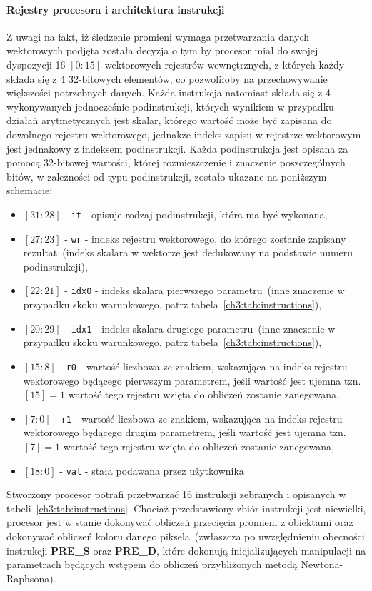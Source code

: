 \paragraph{Rejestry procesora i architektura instrukcji}
Z uwagi na fakt, iż śledzenie promieni wymaga przetwarzania danych wektorowych podjęta została decyzja o tym by procesor miał do swojej dyspozycji 16 $[0:15]$ wektorowych rejestrów wewnętrznych, z których każdy składa się z 4 32-bitowych elementów, co pozwoliłoby na przechowywanie większości potrzebnych danych. Każda instrukcja natomiast składa się z 4 wykonywanych jednocześnie podinstrukcji, których wynikiem w przypadku działań arytmetycznych jest skalar, którego wartość może być zapisana  do dowolnego rejestru wektorowego, jednakże indeks zapisu w rejestrze wektorowym jest jednakowy z indeksem podinstrukcji. Każda podinstrukcja jest opisana za pomocą 32-bitowej wartości, której rozmieszczenie i znaczenie poszczególnych bitów, w zależności od typu podinstrukcji, zostało ukazane na poniższym schemacie:
\begin{itemize}
\item[] $[31:28]$ - \texttt{it} - opisuje rodzaj podinstrukcji, która ma być wykonana,
\item[] $[27:23]$ - \texttt{wr} - indeks rejestru wektorowego, do którego zostanie zapisany rezultat~(indeks skalara w wektorze jest dedukowany na podstawie numeru podinstrukcji),
\item[] $[22:21]$ - \texttt{idx0} - indeks skalara pierwszego parametru~(inne znaczenie w przypadku skoku warunkowego, patrz tabela~\ref{ch3:tab:instructions}),
\item[] $[20:29]$ - \texttt{idx1} - indeks skalara drugiego parametru~(inne znaczenie w przypadku skoku warunkowego, patrz tabela~\ref{ch3:tab:instructions}),
\item[] $[15:8]$ - \texttt{r0} - wartość liczbowa ze znakiem, wskazująca na indeks rejestru wektorowego będącego pierwszym parametrem, jeśli wartość jest ujemna tzn.~$[15]=1$ wartość tego rejestru wzięta do obliczeń zostanie zanegowana,
\item[] $[7:0]$ - \texttt{r1} - wartość liczbowa ze znakiem, wskazująca na indeks rejestru wektorowego będącego drugim parametrem, jeśli wartość jest ujemna tzn. $[7]=1$ wartość tego rejestru wzięta do obliczeń zostanie zanegowana,
\item[] $[18:0]$ - \texttt{val} - stała podawana przez użytkownika
\end{itemize}
Stworzony procesor potrafi przetwarzać 16 instrukcji zebranych i opisanych w tabeli~\ref{ch3:tab:instructions}. Chociaż przedstawiony zbiór instrukcji jest niewielki, procesor jest w stanie dokonywać obliczeń przecięcia promieni z obiektami oraz dokonywać obliczeń koloru danego piksela~(zwłaszcza po uwzględnieniu obecności instrukcji \textbf{PRE\_S} oraz \textbf{PRE\_D}, które dokonują inicjalizujących manipulacji na parametrach będących wstępem do obliczeń przybliżonych metodą Newtona-Raphsona). 

